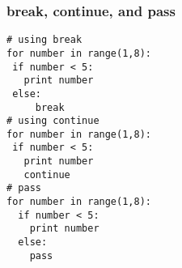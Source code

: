 \documentclass{beamer}
\begin{document}
\begin{frame}[fragile]
\frametitle{break, continue, and pass}
\begin{lstlisting}
# using break
for number in range(1,8):
 if number < 5:
   print number
 else:
     break
# using continue
for number in range(1,8):
 if number < 5:
   print number
   continue
# pass
for number in range(1,8):
  if number < 5:
    print number
  else:
    pass
\end{lstlisting}
\end{frame}
\end{document}
